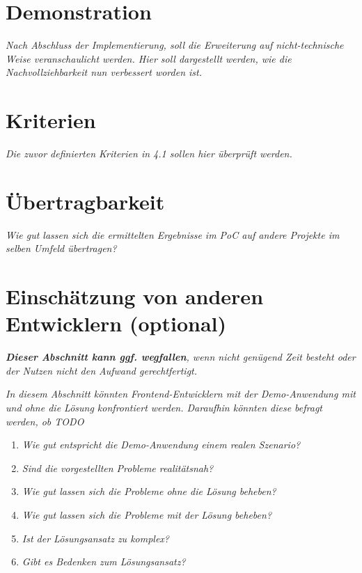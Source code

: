 
\section{Demonstration}

	\textit{Nach Abschluss der Implementierung, soll die Erweiterung auf nicht-technische Weise veranschaulicht werden. Hier soll dargestellt werden, wie die Nachvollziehbarkeit nun verbessert worden ist.}
	
\section{Kriterien}

	\textit{Die zuvor definierten Kriterien in 4.1 sollen hier überprüft werden.}
	
\section{Übertragbarkeit}

	\textit{Wie gut lassen sich die ermittelten Ergebnisse im PoC auf andere Projekte im selben Umfeld übertragen?}
	
\section{Einschätzung von anderen Entwicklern (optional)}

	\textit{\textbf{Dieser Abschnitt kann ggf. wegfallen}, wenn nicht genügend Zeit besteht oder der Nutzen nicht den Aufwand gerechtfertigt.}
	
	\textit{In diesem Abschnitt könnten Frontend-Entwicklern mit der Demo-Anwendung mit und ohne die Lösung konfrontiert werden. Daraufhin könnten diese befragt werden, ob TODO}
	
	\begin{enumerate}
		\item \textit{Wie gut entspricht die Demo-Anwendung einem realen Szenario?}
		\item \textit{Sind die vorgestellten Probleme realitätsnah?}
		\item \textit{Wie gut lassen sich die Probleme ohne die Lösung beheben?}
		\item \textit{Wie gut lassen sich die Probleme mit der Lösung beheben?}
		\item \textit{Ist der Lösungsansatz zu komplex?}
		\item \textit{Gibt es Bedenken zum Lösungsansatz?}
	\end{enumerate}